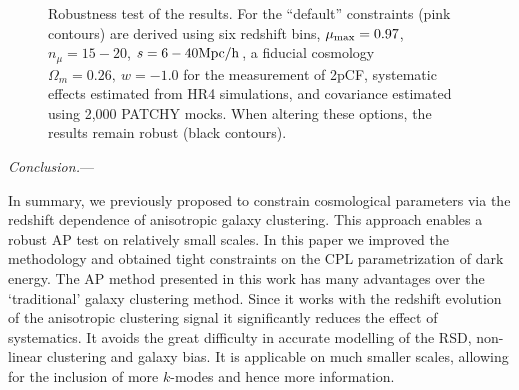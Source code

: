 \documentclass[prl,twocolumn,superscriptaddress,aps,amsmath,amssymb,nofootinbib,altaffilletter]{revtex4}
\begin{document}
\begin{figure}
   \caption{\label{fig_contest}
   Robustness test of the results.
   For the ``default'' constraints (pink contours) are derived using six redshift bins, 
   $\mu_{\rm max}=0.97$, $n_{\mu}=15-20$, $s=6-40 \rm Mpc/h$,
   a fiducial cosmology $\Omega_m=0.26,\ w=-1.0$ for the measurement of 2pCF,
   systematic effects estimated from HR4 simulations, 
   and covariance estimated using 2,000 PATCHY mocks.
   When altering these options, the results remain robust (black contours).
   }
\end{figure}

{\it Conclusion.}---

In summary, we previously proposed to constrain cosmological parameters via 
the redshift dependence of anisotropic galaxy clustering\cite{Li2016}.
This approach enables a robust AP test on relatively small scales.
In this paper we improved the methodology and obtained tight constraints on the CPL parametrization of dark energy.
The AP method presented in this work has many advantages over the `traditional' galaxy clustering method.
Since it works with the redshift evolution of the anisotropic clustering signal it significantly reduces the effect of systematics. 
It avoids the great difficulty in accurate modelling of the RSD, non-linear clustering and galaxy bias.
It is applicable on much smaller scales, allowing for the inclusion of more $k$-modes and hence more information. 
\end{document}
